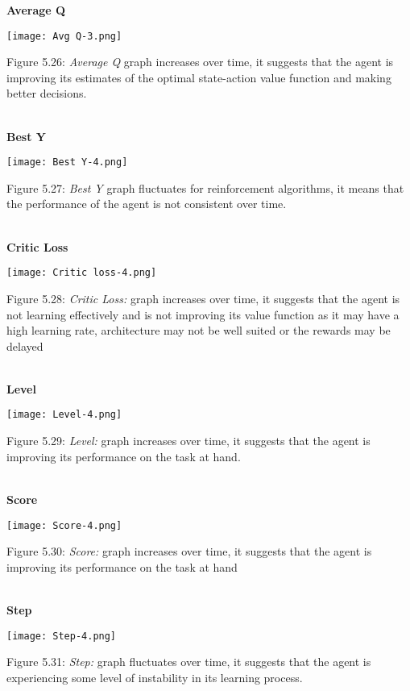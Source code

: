 \documentclass[conference]{IEEEtran}
\begin{document}
\textbf{Average Q}\\

\graphicspath{ {./images/} }
\texttt{[image: Avg Q-3.png]}
\caption{Figure 5.26: \textit{Average Q}  graph increases over time, it suggests that the agent is improving its estimates of the optimal state-action value function and making better decisions.
}\\


\textbf{Best Y}\\

\graphicspath{ {./images/} }
\texttt{[image: Best Y-4.png]}
\caption{Figure 5.27: \textit{Best Y} graph fluctuates for reinforcement algorithms, it means that the performance of the agent is not consistent over time.
}\\

\textbf{Critic Loss}\\

\graphicspath{ {./images/} }
\texttt{[image: Critic loss-4.png]}
\caption{Figure 5.28: \textit{Critic Loss:} graph increases over time, it suggests that the agent is not learning effectively and is not improving its value function as it may have a high learning rate, architecture may not be well suited or the rewards may be delayed
}\\

\textbf{Level}\\

\graphicspath{ {./images/} }
\texttt{[image: Level-4.png]}
\caption{Figure 5.29: \textit{Level:} graph increases over time, it suggests that the agent is improving its performance on the task at hand.
}\\

\textbf{Score}\\

\graphicspath{ {./images/} }
\texttt{[image: Score-4.png]}
\caption{Figure 5.30: \textit{Score: } graph increases over time, it suggests that the agent is improving its performance on the task at hand
}\\

\textbf{Step}\\

\graphicspath{ {./images/} }
\texttt{[image: Step-4.png]}
\caption{Figure 5.31: \textit{Step: }graph fluctuates over time, it suggests that the agent is experiencing some level of instability in its learning process.
}\\
\end{document}

